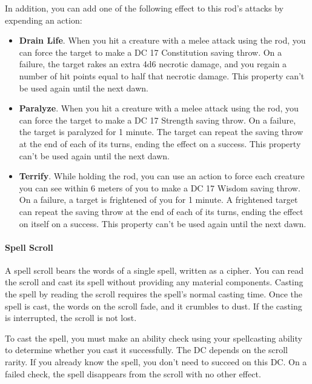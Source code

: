         In addition, you can add one of the following effect to this rod's attacks by expending an action:
        \begin{itemize}
            \item \textbf{Drain Life}.
            When you hit a creature with a melee attack using the rod, you can force the target to make a DC 17 Constitution saving throw.
            On a failure, the target rakes an extra 4d6 necrotic damage, and you regain a number of hit points equal to half that necrotic damage.
            This property can't be used again until the next dawn.
            \item \textbf{Paralyze}.
            When you hit a creature with a melee attack using the rod, you can force the target to make a DC 17 Strength saving throw.
            On a failure, the target is paralyzed for 1 minute.
            The target can repeat the saving throw at the end of each of its turns, ending the effect on a success.
            This property can't be used again until the next dawn.
            \item \textbf{Terrify}.
            While holding the rod, you can use an action to force each creature you can see within 6 meters of you to make a DC 17 Wisdom saving throw.
            On a failure, a target is frightened of you for 1 minute.
            A frightened target can repeat the saving throw at the end of each of its turns, ending the effect on itself on a success.
            This property can't be used again until the next dawn.
        \end{itemize}
    \paragraph{Spell Scroll} \label{item::spellscroll}
        A spell scroll bears the words of a single spell, written as a cipher.
        You can read the scroll and cast its spell without providing any material components.
        Casting the spell by reading the scroll requires the spell's normal casting time.
        Once the spell is cast, the words on the scroll fade, and it crumbles to dust.
        If the casting is interrupted, the scroll is not lost.

        To cast the spell, you must make an ability check using your spellcasting ability to determine whether you cast it successfully.
        The DC depends on the scroll rarity.
        If you already know the spell, you don't need to succeed on this DC.
        On a failed check, the spell disappears from the scroll with no other effect.


